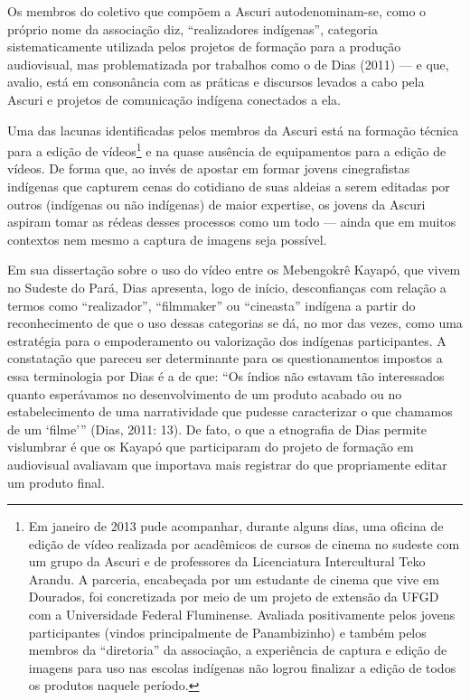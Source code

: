 Os membros do coletivo que compõem a Ascuri autodenominam-se, como o
próprio nome da associação diz, ``realizadores indígenas'', categoria
sistematicamente utilizada pelos projetos de formação para a produção
audiovisual, mas problematizada por trabalhos como o de Dias (2011) — e
que, avalio, está em consonância com as práticas e discursos levados a
cabo pela Ascuri e projetos de comunicação indígena conectados a ela.

Uma das lacunas identificadas pelos membros da Ascuri está na formação
técnica para a edição de vídeos\footnote{Em janeiro de 2013 pude
acompanhar, durante alguns dias, uma oficina de edição de vídeo
realizada por acadêmicos de cursos de cinema no sudeste com um grupo da
Ascuri e de professores da Licenciatura Intercultural Teko Arandu. A
parceria, encabeçada por um estudante de cinema que vive em Dourados,
foi concretizada por meio de um projeto de extensão da UFGD com a
Universidade Federal Fluminense. Avaliada positivamente pelos jovens
participantes (vindos principalmente de Panambizinho) e também pelos
membros da ``diretoria'' da associação, a experiência de captura e edição
de imagens para uso nas escolas indígenas não logrou finalizar a edição
de todos os produtos naquele período. } e na quase ausência de
equipamentos para a edição de vídeos. De forma que, ao invés de apostar
em formar jovens cinegrafistas indígenas que capturem cenas do
cotidiano de suas aldeias a serem editadas por outros (indígenas ou não
indígenas) de maior expertise, os jovens da Ascuri aspiram tomar as
rédeas desses processos como um todo — ainda que em muitos contextos
nem mesmo a captura de imagens seja possível.

Em sua dissertação sobre o uso do vídeo entre os Mebengokrê Kayapó, que
vivem no Sudeste do Pará, Dias apresenta, logo de início, desconfianças
com relação a termos como ``realizador'', ``filmmaker'' ou ``cineasta''
indígena a partir do reconhecimento de que o uso dessas categorias se
dá, no mor das vezes, como uma estratégia para o empoderamento ou
valorização dos indígenas participantes. A constatação que pareceu ser
determinante para os questionamentos impostos a essa terminologia por
Dias é a de que: ``Os índios não estavam tão interessados quanto
esperávamos no desenvolvimento de um produto acabado ou no
estabelecimento de uma narratividade que pudesse caracterizar o que
chamamos de um ‘filme’'' (Dias, 2011: 13). De fato, o que a etnografia
de Dias permite vislumbrar é que os Kayapó que participaram do projeto
de formação em audiovisual avaliavam que importava mais registrar do
que propriamente editar um produto final.

